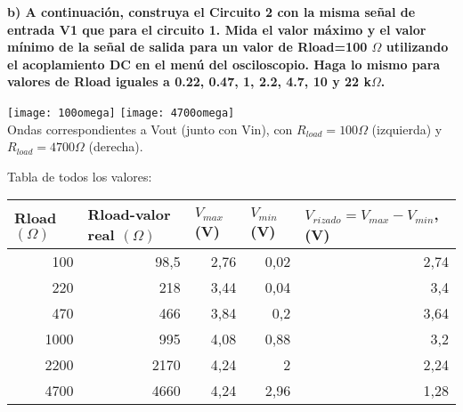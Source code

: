 \documentclass{article}
\begin{document}
\bigskip
\textbf{b) A continuación, construya el Circuito 2 con la misma señal de entrada V1 que para el circuito 1. Mida el valor máximo y el valor mínimo de la señal de salida para un valor de Rload=100 $\Omega$ utilizando el acoplamiento DC en el menú del osciloscopio. Haga lo mismo para valores de Rload iguales a 0.22, 0.47, 1, 2.2, 4.7, 10 y 22 k$\Omega$.}
\bigskip
\begin{center}
\texttt{[image: 100omega]} \texttt{[image: 4700omega]}\\
Ondas correspondientes a Vout (junto con Vin), con $R_{load}=100\Omega$ (izquierda) y $R_{load}=4700\Omega$ (derecha).
\end{center}

Tabla de todos los valores:
\begin{table}[ht!]
\centering
\begin{tabular}{|r|r|r|r|r|}
\hline
\multicolumn{1}{|l|}{Rload $(\Omega)$} & \multicolumn{1}{l|}{Rload-valor real $(\Omega)$} & \multicolumn{1}{l|}{$V_{max}$ (V)} & \multicolumn{1}{l|}{$V_{min}$ (V)} & \multicolumn{1}{l|}{$V_{rizado}=V_{max}-V_{min}$, (V)} \\ \hline
100                                    & 98,5                                             & 2,76                               & 0,02                                                    & 2,74                         \\ \hline
220                                    & 218                                              & 3,44                               & 0,04                                                    & 3,4                          \\ \hline
470                                    & 466                                              & 3,84                               & 0,2                                                     & 3,64                         \\ \hline
1000                                   & 995                                              & 4,08                               & 0,88                                                    & 3,2                          \\ \hline
2200                                   & 2170                                             & 4,24                               & 2                                                       & 2,24                         \\ \hline
4700                                   & 4660                                             & 4,24                               & 2,96                                                    & 1,28                         \\ \hline

\end{tabular}
\end{table}
\end{document}
